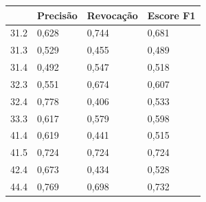 \begin{tabular}{llll}
\toprule
 & Precisão & Revocação & Escore F1 \\
\midrule
31.2 & 0,628 & 0,744 & 0,681 \\
31.3 & 0,529 & 0,455 & 0,489 \\
31.4 & 0,492 & 0,547 & 0,518 \\
32.3 & 0,551 & 0,674 & 0,607 \\
32.4 & 0,778 & 0,406 & 0,533 \\
33.3 & 0,617 & 0,579 & 0,598 \\
41.4 & 0,619 & 0,441 & 0,515 \\
41.5 & 0,724 & 0,724 & 0,724 \\
42.4 & 0,673 & 0,434 & 0,528 \\
44.4 & 0,769 & 0,698 & 0,732 \\
\bottomrule
\end{tabular}
